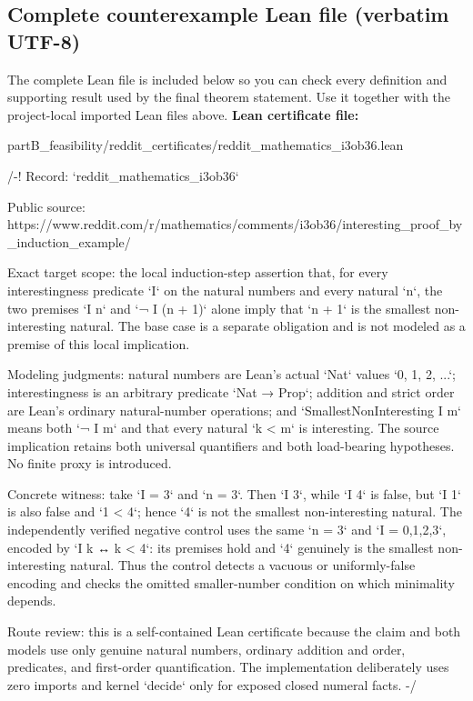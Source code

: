\documentclass[11pt]{article}
\begin{document}
\subsection*{Complete counterexample Lean file (verbatim UTF-8)}
The complete Lean file is included below so you can check every definition and supporting result used by the final theorem statement. Use it together with the project-local imported Lean files above.
\textbf{Lean certificate file:}
\begin{Vsrc}
partB_feasibility/reddit_certificates/reddit_mathematics_i3ob36.lean
\end{Vsrc}
\begin{Vlean}
/-!
Record: `reddit_mathematics_i3ob36`

Public source: https://www.reddit.com/r/mathematics/comments/i3ob36/interesting_proof_by_induction_example/

Exact target scope: the local induction-step assertion that, for every
interestingness predicate `I` on the natural numbers and every natural `n`,
the two premises `I n` and `¬ I (n + 1)` alone imply that `n + 1` is the
smallest non-interesting natural.  The base case is a separate obligation and
is not modeled as a premise of this local implication.

Modeling judgments: natural numbers are Lean's actual `Nat` values
`0, 1, 2, ...`; interestingness is an arbitrary predicate `Nat → Prop`;
addition and strict order are Lean's ordinary natural-number operations; and
`SmallestNonInteresting I m` means both `¬ I m` and that every natural `k < m`
is interesting.  The source implication retains both universal quantifiers
and both load-bearing hypotheses.  No finite proxy is introduced.

Concrete witness: take `I = {3}` and `n = 3`.  Then `I 3`, while `I 4` is
false, but `I 1` is also false and `1 < 4`; hence `4` is not the smallest
non-interesting natural.  The independently verified negative control uses
the same `n = 3` and `I = {0,1,2,3}`, encoded by `I k ↔ k < 4`: its premises
hold and `4` genuinely is the smallest non-interesting natural.  Thus the
control detects a vacuous or uniformly-false encoding and checks the omitted
smaller-number condition on which minimality depends.

Route review: this is a self-contained Lean certificate because the claim and
both models use only genuine natural numbers, ordinary addition and order,
predicates, and first-order quantification.  The implementation deliberately
uses zero imports and kernel `decide` only for exposed closed numeral facts.
-/


\end{Vlean}
\end{document}
